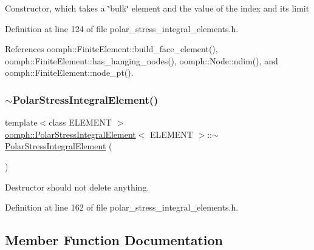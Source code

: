 Constructor, which takes a \char`\"{}bulk\char`\"{} element and the value of the index and its limit 

Definition at line 124 of file polar\+\_\+stress\+\_\+integral\+\_\+elements.\+h.



References oomph\+::\+Finite\+Element\+::build\+\_\+face\+\_\+element(), oomph\+::\+Finite\+Element\+::has\+\_\+hanging\+\_\+nodes(), oomph\+::\+Node\+::ndim(), and oomph\+::\+Finite\+Element\+::node\+\_\+pt().

\mbox{\label{classoomph_1_1PolarStressIntegralElement_a4463b248acefefe8287450d9deef50cf}} 
\subsubsection{\texorpdfstring{$\sim$\+Polar\+Stress\+Integral\+Element()}{~PolarStressIntegralElement()}}
{\footnotesize\ttfamily template$<$class E\+L\+E\+M\+E\+NT $>$ \\
\hyperlink{classoomph_1_1PolarStressIntegralElement}{oomph\+::\+Polar\+Stress\+Integral\+Element}$<$ E\+L\+E\+M\+E\+NT $>$\+::$\sim$\hyperlink{classoomph_1_1PolarStressIntegralElement}{Polar\+Stress\+Integral\+Element} (\begin{DoxyParamCaption}{ }\end{DoxyParamCaption})\hspace{0.3cm}{\ttfamily [inline]}}



Destructor should not delete anything. 



Definition at line 162 of file polar\+\_\+stress\+\_\+integral\+\_\+elements.\+h.



\subsection{Member Function Documentation}
\mbox{\label{classoomph_1_1PolarStressIntegralElement_a1a8b2e072b3dbfbfe755e6a6f1d5e051}} 
